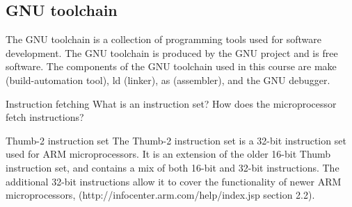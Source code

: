 \subsection{GNU toolchain}
The GNU toolchain is a collection of programming tools used for software development. The GNU toolchain is produced by the GNU project and is free software. The components of the GNU toolchain used in this course are make (build-automation tool), ld (linker), as (assembler), and the GNU debugger.\cite{gnu.org}

Instruction fetching
What is an instruction set? How does the microprocessor fetch instructions?

Thumb-2 instruction set
The Thumb-2 instruction set is a 32-bit instruction set used for ARM microprocessors. It is an extension of the older 16-bit Thumb instruction set, and contains a mix of both 16-bit and 32-bit instructions. The additional 32-bit instructions allow it to cover the functionality of newer ARM microprocessors, (http://infocenter.arm.com/help/index.jsp section 2.2).
